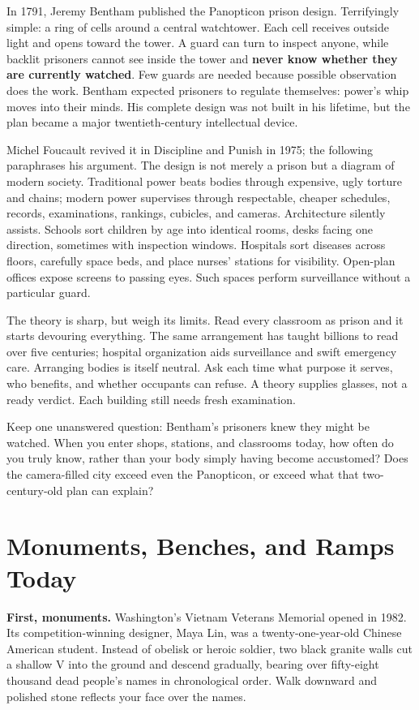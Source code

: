 In 1791, Jeremy Bentham published the Panopticon prison design. Terrifyingly simple: a ring of cells around a central watchtower. Each cell receives outside light and opens toward the tower. A guard can turn to inspect anyone, while backlit prisoners cannot see inside the tower and \textbf{never know whether they are currently watched}. Few guards are needed because possible observation does the work. Bentham expected prisoners to regulate themselves: power's whip moves into their minds. His complete design was not built in his lifetime, but the plan became a major twentieth-century intellectual device.

Michel Foucault revived it in Discipline and Punish in 1975; the following paraphrases his argument. The design is not merely a prison but a diagram of modern society. Traditional power beats bodies through expensive, ugly torture and chains; modern power supervises through respectable, cheaper schedules, records, examinations, rankings, cubicles, and cameras. Architecture silently assists. Schools sort children by age into identical rooms, desks facing one direction, sometimes with inspection windows. Hospitals sort diseases across floors, carefully space beds, and place nurses' stations for visibility. Open-plan offices expose screens to passing eyes. Such spaces perform surveillance without a particular guard.

The theory is sharp, but weigh its limits. Read every classroom as prison and it starts devouring everything. The same arrangement has taught billions to read over five centuries; hospital organization aids surveillance and swift emergency care. Arranging bodies is itself neutral. Ask each time what purpose it serves, who benefits, and whether occupants can refuse. A theory supplies glasses, not a ready verdict. Each building still needs fresh examination.

Keep one unanswered question: Bentham's prisoners knew they might be watched. When you enter shops, stations, and classrooms today, how often do you truly know, rather than your body simply having become accustomed? Does the camera-filled city exceed even the Panopticon, or exceed what that two-century-old plan can explain?

\section{Monuments, Benches, and Ramps Today}
\textbf{First, monuments.} Washington's Vietnam Veterans Memorial opened in 1982. Its competition-winning designer, Maya Lin, was a twenty-one-year-old Chinese American student. Instead of obelisk or heroic soldier, two black granite walls cut a shallow V into the ground and descend gradually, bearing over fifty-eight thousand dead people's names in chronological order. Walk downward and polished stone reflects your face over the names.

